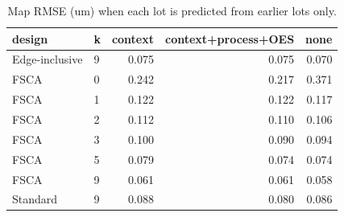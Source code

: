 \begin{table}[t]
\centering
\caption{Map RMSE (um) when each lot is predicted from earlier lots only.}
\label{tab:forward}
\footnotesize
\begin{tabular}{llrrr}
\toprule
design & k & context & context+process+OES & none \\
\midrule
Edge-inclusive & 9 & 0.075 & 0.075 & 0.070 \\
FSCA & 0 & 0.242 & 0.217 & 0.371 \\
FSCA & 1 & 0.122 & 0.122 & 0.117 \\
FSCA & 2 & 0.112 & 0.110 & 0.106 \\
FSCA & 3 & 0.100 & 0.090 & 0.094 \\
FSCA & 5 & 0.079 & 0.074 & 0.074 \\
FSCA & 9 & 0.061 & 0.061 & 0.058 \\
Standard & 9 & 0.088 & 0.080 & 0.086 \\
\bottomrule
\end{tabular}
\end{table}
